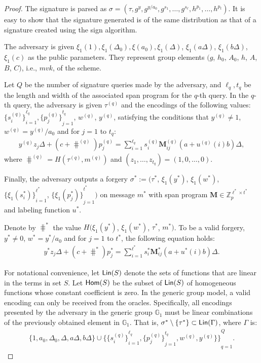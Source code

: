 \begin{proof}
  The signature is parsed as $\sigma=(\tau, g^y, g^{y/a_0}, g^{s_1}, \dots, g^{s_\ell}, h^{p_1}, \dots, h^{p_t})$. It is easy to show that the signature generated is of the same distribution as that of a signature created using the sign algorithm.

  The adversary is given $\xi_1(1), \xi_1(\Delta_0), \xi(a_0), \xi_1(\Delta)$, $\xi_1(a\Delta)$, $\xi_1(b\Delta)$, $\xi_1(c)$ as the public parameters. They represent group elements $(g$, $h_0$, $A_0$, $h$, $A$, $B$, $C)$, i.e., $mvk$, of the scheme.

  Let $Q$ be the number of signature queries made by the adversary, and $\ell_q, t_q$ be the length and width of the associated span program for the $q$-th query. In the $q$-th query, the adversary is given $\tau^{(q)}$ and the encodings of the following values: ${\{s_i^{(q)}\}}_{i=1}^{\ell_q}, {\{p_j^{(q)}\}}_{j=1}^{t_q}$, $w^{(q)}$, $y^{(q)}$, satisfying the conditions that $y^{(q)} \neq 1$, $w^{(q)} = y^{(q)}/a_0$ and for $j=1$ to $t_q$:
  \begin{align*}
    y^{(q)} z_j \Delta + (c + \hash^{(q)}) p^{(q)}_j = \sum_{i=1}^{\ell_q} s^{(q)}_i \mathbf{M}^{(q)}_{ij}(a+u^{(q)}(i)b)\Delta,
  \end{align*}
  where $\hash^{(q)}=H(\tau^{(q)}, m^{(q)})$ and $(z_1, \dots, z_{t_q}) = (1, 0, \dots, 0)$.

  Finally, the adversary outputs a forgery $\sigma^{\ast}:=(\tau^\ast$, $\xi_1(y^*)$, $\xi_1(w^\ast)$, ${\{\xi_1(s^{\ast}_i)\}}_{i=1}^{\ell^{\ast}}$, ${\{\xi_1(p^{\ast}_j)\}}_{j=1}^{t^\ast})$ on message $m^{\ast}$ with span program $\mathbf{M}\in\mathbb{Z}_p^{\ell^\ast \times t^\ast}$ and labeling function $u^\ast$.

  Denote by $\hash^\ast$ the value $H(\xi_1(y^*)$, $\xi_1(w^\ast)$, $\tau^\ast$, $m^\ast)$. To be a valid forgery, $y^\ast \neq 0$, $w^\ast = y^\ast/a_0$ and for $j=1$ to $t^\ast$, the following equation holds:
  \begin{align*}
    y^\ast z_j \Delta + (c + \hash^\ast)p^\ast_j = \sum_{i=1}^{\ell^\ast} s^\ast_i \mathbf{M}^\ast_{ij}(a+u^\ast(i)b)\Delta.
  \end{align*}

  For notational convenience, let $\textsf{Lin}(S)$ denote the sets of functions that are linear in the terms in set $S$. Let $\textsf{Hom}(S)$ be the subset of $\textsf{Lin}(S)$ of homogeneous functions whose constant coefficient is zero. In the generic group model, a valid encoding can only be received from the oracles. Specifically, all encodings presented by the adversary in the generic group $\mathbb{G}_1$ must be linear combinations of the previously obtained element in $\mathbb{G}_1$. That is, $\sigma^\ast \setminus \{\tau^\ast\}  \subset \textsf{Lin}(\Gamma)$, where $\Gamma$ is:
  \begin{align*}
  \{1, a_0, \Delta_0, \Delta, a\Delta, b\Delta\} \cup {\{{\{s_i^{(q)}\}}_{i=1}^{\ell_q}, {\{p_j^{(q)}\}}_{j=1}^{t_q}, w^{(q)}, y^{(q)}\}\}}_{q=1}^Q.
\end{align*}


\end{proof}
